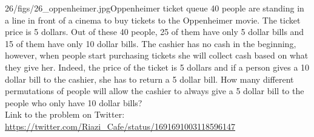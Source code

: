 \begin{problem}{26/figs/26_oppenheimer.jpg}{Oppenheimer ticket queue}
40 people are standing in a line in front of a cinema to buy tickets to the Oppenheimer movie. The ticket price is 5 dollars. Out of these 40 people, 25 of them have only 5 dollar bills and 15 of them have only 10 dollar bills. The cashier has no cash in the beginning, however, when people start purchasing tickets she will collect cash based on what they give her. Indeed, the price of the ticket is 5 dollars and if a person gives a 10 dollar bill to the cashier, she has to return a 5 dollar bill. How many different permutations of people will allow the cashier to always give a 5 dollar bill to the people who only have 10 dollar bills?\\[0.2cm]

Link to the problem on Twitter:  \url{https://twitter.com/Riazi_Cafe/status/1691691003118596147}\end{problem}